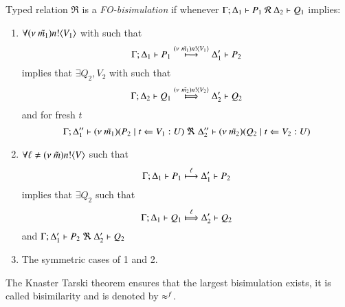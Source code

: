 \begin{definition}\rm
	\label{def:FO_bisim}
	Typed relation 
	$\Re$ is a {\em FO-bisimulation} if whenever
	$\horel{\Gamma}{\Delta_1}{P_1}{\ \mathcal{R}\ }{\Delta_2}{Q_1}$ implies:
	\begin{enumerate}
		\item	$\forall (\nu\ \tilde{m_1}) n ! \langle V_1 \rangle$ with  such that
			\[
				\Gamma; \Delta_1 \vdash P_1 \stackrel{(\nu\ \tilde{m_1}) n ! \langle V_1 \rangle}{\longmapsto} \Delta_1' \vdash P_2
			\]
			implies that $\exists Q_2, V_2$ with  such that
			\[
				\horel{\Gamma}{\Delta_2}{Q_1}{\Hby{\news{\tilde{m_2}} \bactout{n}{V_2}}}{\Delta_2'}{Q_2}
			\]
			and for fresh $t$
			\[
				\Gamma; \Delta_1'' \vdash (\nu\ \tilde{m_1})(P_2 \;|\; t \Leftarrow V_1:U) \ \Re\  \Delta_2'' \vdash{(\nu\ \tilde{m_2})(Q_2 \;|\;t \Leftarrow V_2:U)}
			\]
%
		\item	$\forall \ell \not= (\nu\ \tilde{m}) n ! \langle V \rangle$ such that
			\[
				\Gamma; \Delta_1 \vdash P_1 \stackrel{\ell}{\longmapsto} \Delta_1' \vdash P_2
			\]
			implies that $\exists Q_2$ such that 
			\[
				\horel{\Gamma}{\Delta_1}{Q_1}{\Hby{\ell}}{\Delta_2'}{Q_2}
			\]
			and
			$\horel{\Gamma}{\Delta_1'}{P_2}{\ \Re\ }{\Delta_2'}{Q_2}$

		\item	The symmetric cases of 1 and 2.
	\end{enumerate}
	The Knaster Tarski theorem ensures that the largest bisimulation exists,
	it is called bisimilarity and is denoted by $\approx^{f}$.
\end{definition}

